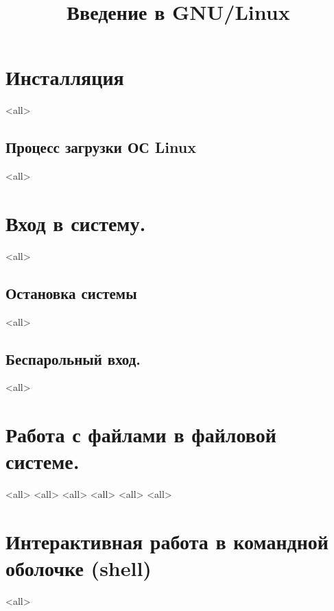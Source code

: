 

\title{Введение в GNU/Linux}




\begin{frame}
	\frametitle{}
	\titlepage
	\vspace{-0.5cm}
	\begin{center}
	\end{center}
\end{frame}


\begin{frame}
	\tableofcontents
	[hideallsubsections]
\end{frame}


\section{Инсталляция}
\mode<all>{}
\subsection{Процесс загрузки ОС Linux}
\mode<all>{}

\section{Вход в систему.}
\mode<all>{}
\subsection{Остановка системы}
\mode<all>{}
\subsection{Беспарольный вход.}
\mode<all>{}


\section{Работа с файлами в файловой системе.}
\mode<all>{}
\mode<all>{}
\mode<all>{}
\mode<all>{}
\mode<all>{}
\mode<all>{}
\section{Интерактивная работа в командной оболочке (shell)}
\mode<all>{}

\bye
